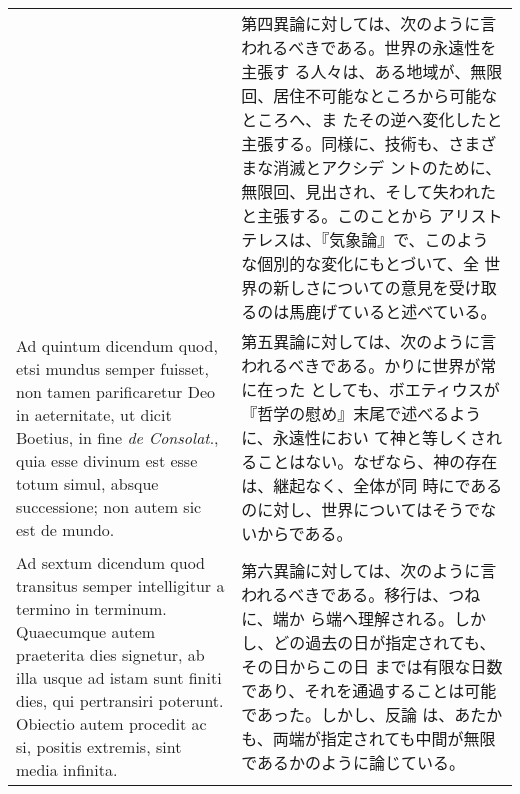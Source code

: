 \documentclass[10pt]{jsarticle} %
\begin{document}
\begin{longtable}{p{21em}p{21em}}
&


第四異論に対しては、次のように言われるべきである。世界の永遠性を主張す
る人々は、ある地域が、無限回、居住不可能なところから可能なところへ、ま
たその逆へ変化したと主張する。同様に、技術も、さまざまな消滅とアクシデ
ントのために、無限回、見出され、そして失われたと主張する。このことから
アリストテレスは、『気象論』で、このような個別的な変化にもとづいて、全
世界の新しさについての意見を受け取るのは馬鹿げていると述べている。


\\


{\sc Ad quintum dicendum} quod, etsi mundus semper fuisset, non tamen
 parificaretur Deo in aeternitate, ut dicit Boetius, in fine {\it de
 Consolat}., quia esse divinum est esse totum simul, absque successione;
 non autem sic est de mundo.

&


第五異論に対しては、次のように言われるべきである。かりに世界が常に在った
としても、ボエティウスが『哲学の慰め』末尾で述べるように、永遠性におい
て神と等しくされることはない。なぜなら、神の存在は、継起なく、全体が同
時にであるのに対し、世界についてはそうでないからである。


\\


{\sc Ad sextum dicendum} quod transitus semper intelligitur a termino in
 terminum. Quaecumque autem praeterita dies signetur, ab illa usque ad
 istam sunt finiti dies, qui pertransiri poterunt. Obiectio autem
 procedit ac si, positis extremis, sint media infinita.

&

第六異論に対しては、次のように言われるべきである。移行は、つねに、端か
ら端へ理解される。しかし、どの過去の日が指定されても、その日からこの日
までは有限な日数であり、それを通過することは可能であった。しかし、反論
は、あたかも、両端が指定されても中間が無限であるかのように論じている。

\\



\end{longtable}
\end{document}
